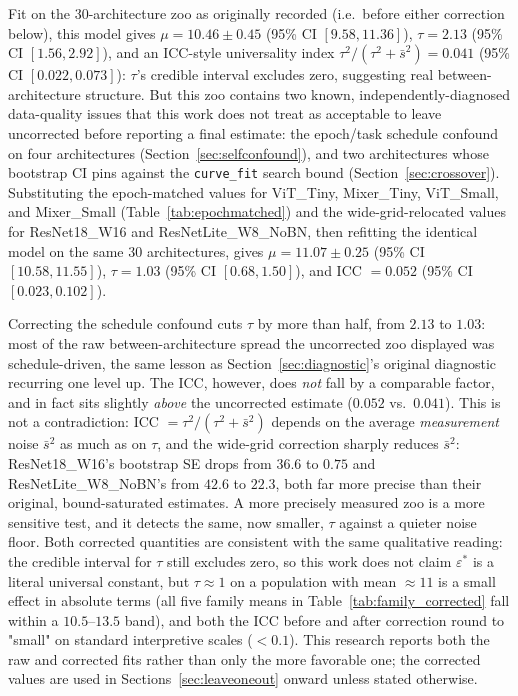 \documentclass[11pt]{article}
\newcommand{\eps}{\varepsilon}
\newcommand{\epsstar}{\eps^{*}}
\begin{document}
Fit on the 30-architecture zoo as originally recorded (i.e.\ before either
correction below), this model gives $\mu = 10.46 \pm 0.45$ (95\% CI
$[9.58, 11.36]$), $\tau = 2.13$ (95\% CI $[1.56, 2.92]$), and an ICC-style
universality index $\tau^2/(\tau^2+\bar s^2) = 0.041$ (95\% CI
$[0.022, 0.073]$): $\tau$'s credible interval excludes zero, suggesting real
between-architecture structure. But this zoo contains two known,
independently-diagnosed data-quality issues that this work does not treat as
acceptable to leave uncorrected before reporting a final estimate: the
epoch/task schedule confound on four architectures
(Section~\ref{sec:selfconfound}), and two architectures whose bootstrap CI
pins against the \texttt{curve\_fit} search bound
(Section~\ref{sec:crossover}). Substituting the epoch-matched values for
ViT\_Tiny, Mixer\_Tiny, ViT\_Small, and Mixer\_Small
(Table~\ref{tab:epochmatched}) and the wide-grid-relocated values for
ResNet18\_W16 and ResNetLite\_W8\_NoBN, then refitting the identical model
on the same 30 architectures, gives $\mu = 11.07 \pm 0.25$ (95\% CI
$[10.58, 11.55]$), $\tau = 1.03$ (95\% CI $[0.68, 1.50]$), and
ICC $=0.052$ (95\% CI $[0.023, 0.102]$).

Correcting the schedule confound cuts $\tau$ by more than half, from $2.13$
to $1.03$: most of the raw between-architecture spread the uncorrected
zoo displayed was schedule-driven, the same lesson as
Section~\ref{sec:diagnostic}'s original diagnostic recurring one level up.
The ICC, however, does \emph{not} fall by a comparable factor, and in fact
sits slightly \emph{above} the uncorrected estimate ($0.052$ vs.\ $0.041$).
This is not a contradiction: ICC $=\tau^2/(\tau^2+\bar s^2)$ depends on the
average \emph{measurement} noise $\bar s^2$ as much as on $\tau$, and the
wide-grid correction sharply reduces $\bar s^2$: ResNet18\_W16's bootstrap
SE drops from $36.6$ to $0.75$ and ResNetLite\_W8\_NoBN's from $42.6$ to
$22.3$, both far more precise than their original, bound-saturated
estimates. A more precisely measured zoo is a more sensitive test, and it
detects the same, now smaller, $\tau$ against a quieter noise floor. Both
corrected quantities are consistent with the same qualitative reading: the
credible interval for $\tau$ still excludes zero, so this work does not claim
$\epsstar$ is a literal universal constant, but $\tau\approx1$ on a
population with mean $\approx11$ is a small effect in absolute terms (all
five family means in Table~\ref{tab:family_corrected} fall within a
$10.5$--$13.5$ band), and both the ICC before and after correction round to
"small" on standard interpretive scales ($<0.1$). This research reports both the raw
and corrected fits rather than only the more favorable one; the corrected
values are used in Sections~\ref{sec:leaveoneout} onward unless stated
otherwise.
\end{document}
